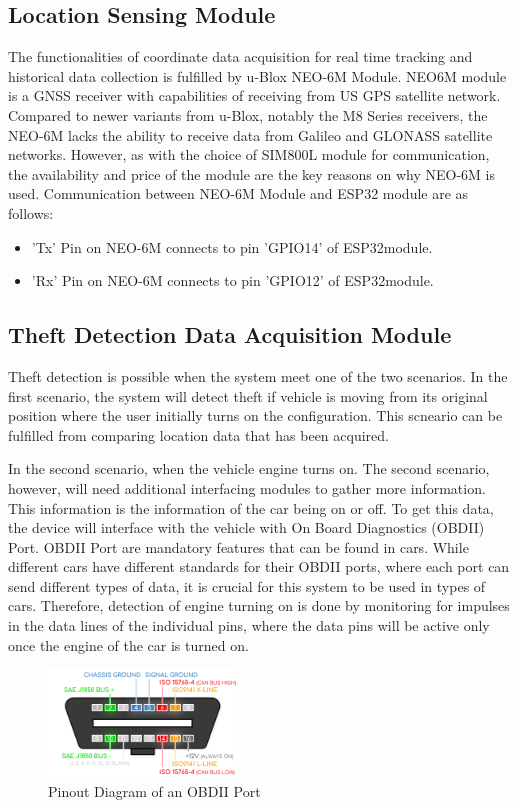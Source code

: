 \documentclass[conference]{IEEEtran}
\begin{document}
\subsection{Location Sensing Module}
The functionalities of coordinate data acquisition for real time tracking and historical data collection is fulfilled by u-Blox NEO-6M Module. NEO6M module is a GNSS receiver with capabilities of receiving from US GPS satellite network. Compared to newer variants from u-Blox, notably the M8 Series receivers, the NEO-6M lacks the ability to receive data from Galileo and GLONASS satellite networks. However, as with 
the choice of SIM800L module for communication, the availability and price of the module are the key reasons on why NEO-6M is used. Communication between NEO-6M Module and ESP32 module are as follows:
\begin{itemize}
\item 'Tx' Pin on NEO-6M connects to pin 'GPIO14' of ESP32module.
\item 'Rx' Pin on NEO-6M connects to pin 'GPIO12' of ESP32module.
\end{itemize}

\subsection{Theft Detection Data Acquisition Module}
Theft detection is possible when the system meet one of the two scenarios. In the first scenario, the system will detect theft if vehicle is moving from its original position where the user initially turns on the configuration. This scneario can be fulfilled from comparing location data that has been acquired.

In the second scenario, when the vehicle engine turns on. The second scenario, however, will need additional interfacing modules to gather more information. This information is the information of the car being on or off. To get this data, the device will interface with the vehicle with On Board Diagnostics (OBDII) Port. OBDII Port are mandatory features that can be found in cars. 
While different cars have different standards for their OBDII ports, where each port can send different types of data, it is crucial for this system to be used in types of cars. Therefore, detection of engine turning on is done by monitoring for impulses in the data lines of the individual pins, where the data pins will be active only once the engine of the car is turned on.

\begin{figure}[h!]
    \centering
    \includegraphics[width=0.45\textwidth]{obddiagram}
    \caption{Pinout Diagram of an OBDII Port}
    \label{fig4}
\end{figure}
\end{document}
